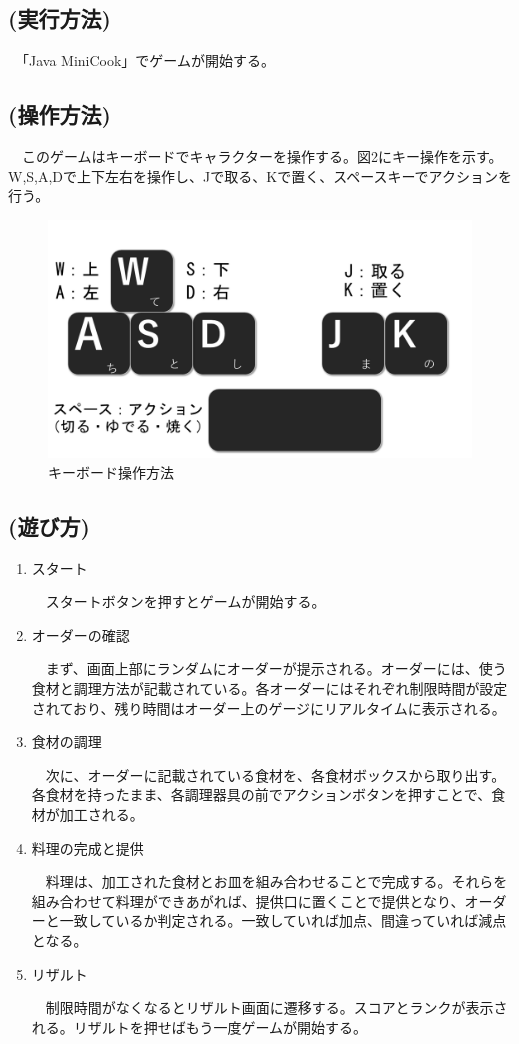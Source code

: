 \documentclass[a4j]{jarticle} %
\begin{document}
\subsection*{(実行方法)}
　「Java MiniCook」でゲームが開始する。
\subsection*{(操作方法)}
　このゲームはキーボードでキャラクターを操作する。図2にキー操作を示す。W,S,A,Dで上下左右を操作し、Jで取る、Kで置く、スペースキーでアクションを行う。
\begin{figure}[H]
  \begin{center}
  \includegraphics[scale=0.2]{img/key.png}
  \caption{キーボード操作方法}
  \end{center}
\end{figure}
\subsection*{(遊び方)}
\begin{enumerate}
  \item スタート\par
  　スタートボタンを押すとゲームが開始する。 
  \item オーダーの確認\par
  　まず、画面上部にランダムにオーダーが提示される。オーダーには、使う食材と調理方法が記載されている。各オーダーにはそれぞれ制限時間が設定されており、残り時間はオーダー上のゲージにリアルタイムに表示される。
  \item 食材の調理\par
  　次に、オーダーに記載されている食材を、各食材ボックスから取り出す。各食材を持ったまま、各調理器具の前でアクションボタンを押すことで、食材が加工される。
  \item 料理の完成と提供\par
  　料理は、加工された食材とお皿を組み合わせることで完成する。それらを組み合わせて料理ができあがれば、提供口に置くことで提供となり、オーダーと一致しているか判定される。一致していれば加点、間違っていれば減点となる。   
  \item リザルト\par
  　制限時間がなくなるとリザルト画面に遷移する。スコアとランクが表示される。リザルトを押せばもう一度ゲームが開始する。
\end{enumerate}
\end{document}
